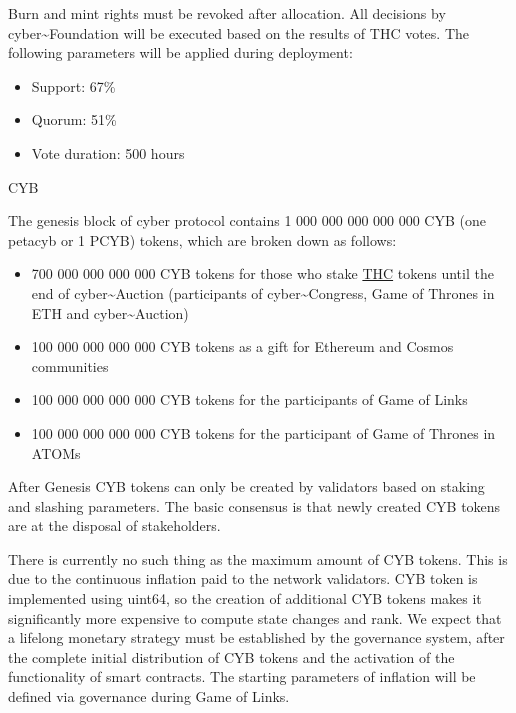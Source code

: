 \documentclass[8pt,oneside]{amsart}
\makeatletter
\renewcommand\subsection{\@startsection{subsection}
                                    {2}{\z@}
                                    {-3.25ex\@plus -1ex \@minus -.2ex}
                                    {0ex \@plus .2ex}
                                    {\play\Large}
                        }
\newcommand{\titleSection}[1]{\subsection{#1}}
\newenvironment{Figure}
  {\par\medskip\noindent\minipage{\linewidth}}
  {\endminipage\par\medskip}
\makeatother
\begin{document}
\begin{Figure}
 \centering
 
\end{Figure}

Burn and mint rights must be revoked after allocation. All decisions by cyber\~{}Foundation will be executed based on the results of THC votes. The following parameters will be applied during deployment:

\begin{itemize}
\item Support: 67\%
\item Quorum: 51\%
\item Vote duration: 500 hours
\end{itemize}

\titleSection{CYB}\label{cyb}

The genesis block of cyber protocol contains 1 000 000 000 000 000 CYB (one petacyb or 1 PCYB) tokens, which are broken down as follows:

\begin{itemize}
\item 700 000 000 000 000 CYB tokens for those who stake {\hyperref[thc]{THC}} tokens until the end of cyber\~{}Auction (participants of cyber\~{}Congress, Game of Thrones in ETH and cyber\~{}Auction)
\item 100 000 000 000 000 CYB tokens as a gift for Ethereum and Cosmos communities
\item 100 000 000 000 000 CYB tokens for the participants of Game of Links
\item 100 000 000 000 000 CYB tokens for the participant of Game of Thrones in ATOMs
\end{itemize}

\begin{Figure}
 \centering
 
\end{Figure}

After Genesis CYB tokens can only be created by validators based on staking and slashing parameters. The basic consensus is that newly created CYB tokens are at the disposal of stakeholders.

There is currently no such thing as the maximum amount of CYB tokens. This is due to the continuous inflation paid to the network validators. CYB token is implemented using uint64, so the creation of additional CYB tokens makes it significantly more expensive to compute state changes and rank. We expect that a lifelong monetary strategy must be established by the governance system, after the complete initial distribution of CYB tokens and the activation of the functionality of smart contracts. The starting parameters of inflation will be defined via governance during Game of Links.
\end{document}
